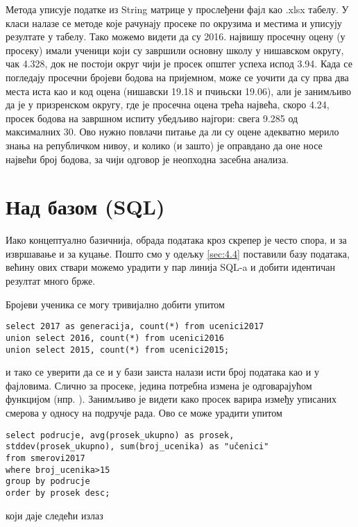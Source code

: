 Метода  уписује податке из String матрице у прослеђени фајл као .xlsx табелу. У класи  налазе се методе које рачунају просеке по окрузима и местима и уписују резултате у табелу. Тако можемо видети да су 2016. највишу просечну оцену (у просеку) имали ученици који су завршили основну школу у нишавском округу, чак 4.328, док не постоји округ чији је просек општег успеха испод 3.94. Када се погледају просечни бројеви бодова на пријемном, може се уочити да су прва два места иста као и код оцена (нишавски 19.18 и пчињски 19.06), али је занимљиво да је у призренском округу, где је просечна оцена трећа највећа, скоро 4.24, просек бодова на завршном испиту убедљиво најгори: свега 9.285 од максималних 30. Ово нужно повлачи питање да ли су оцене адекватно мерило знања на републичком нивоу, и колико (и зашто) је оправдано да оне носе највећи број бодова, за чији одговор је неопходна засебна анализа.

\section{Над базом (SQL)}\label{ch:obradasql}

Иако концептуално базичнија, обрада података кроз скрепер је често спора, и за извршавање и за куцање. Пошто смо у одељку \ref{sec:4.4} поставили базу података, већину ових ствари можемо урадити у пар линија SQL-a и добити идентичан резултат много брже.

Бројеви ученика се могу тривијално добити упитом 
\begin{verbatim}
select 2017 as generacija, count(*) from ucenici2017 
union select 2016, count(*) from ucenici2016 
union select 2015, count(*) from ucenici2015;
\end{verbatim} 
и тако се уверити да се и у бази заиста налази исти број података као и у фајловима. Слично за просеке, једина потребна измена је  одговарајућом функцијом (нпр. ). Занимљиво је видети како просек варира између уписаних смерова у односу на подручје рада. Ово се може урадити упитом
\begin{verbatim}
select podrucje, avg(prosek_ukupno) as prosek, 
stddev(prosek_ukupno), sum(broj_ucenika) as "učenici"
from smerovi2017 
where broj_ucenika>15 
group by podrucje 
order by prosek desc;
\end{verbatim}
који даје следећи излаз

